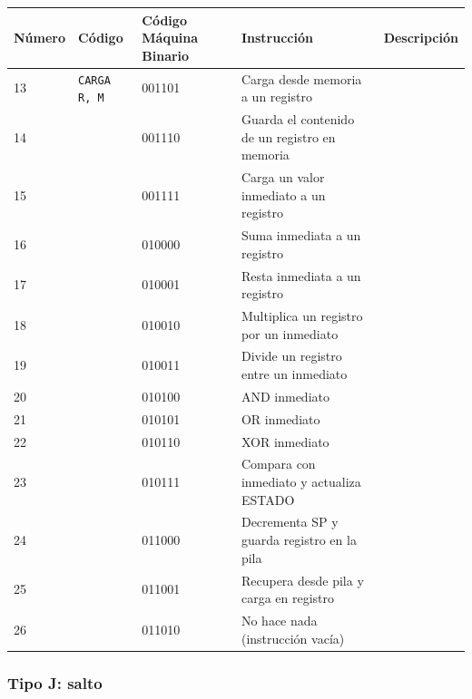 \documentclass{article}
\begin{document}
\begin{table}[H]
    \centering
    \begin{tabular}{|p{1.3cm}|p{3cm}|p{1.6cm}|p{5cm}|p{4cm}|}
    \hline
    \textbf{Número} & \textbf{Código} & \textbf{Código Máquina Binario} & \textbf{Instrucción} & \textbf{Descripción} \\
    \hline
    13 & \texttt{CARGA R, M} & 001101 & Carga desde memoria a un registro & \\
    \hline
    14 & & 001110 & Guarda el contenido de un registro en memoria & \\
    \hline
    15 & & 001111 & Carga un valor inmediato a un registro & \\
    \hline
    16 & & 010000 & Suma inmediata a un registro & \\
    \hline
    17 & & 010001 & Resta inmediata a un registro & \\
    \hline
    18 & & 010010 & Multiplica un registro por un inmediato & \\
    \hline
    19 & & 010011 & Divide un registro entre un inmediato & \\
    \hline
    20 & & 010100 & AND inmediato & \\
    \hline
    21 & & 010101 & OR inmediato & \\
    \hline
    22 & & 010110 & XOR inmediato & \\
    \hline
    23 & & 010111 & Compara con inmediato y actualiza ESTADO & \\
    \hline
    24 & & 011000 & Decrementa SP y guarda registro en la pila & \\
    \hline
    25 & & 011001 & Recupera desde pila y carga en registro & \\
    \hline
    26 & & 011010 & No hace nada (instrucción vacía) & \\
    \hline
    \end{tabular}
\end{table}

\subsubsection{Tipo J: \textbf{salto}}
\end{document}
